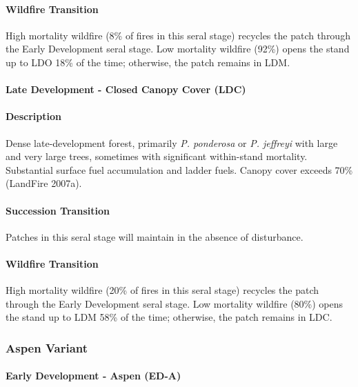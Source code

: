 \paragraph{Wildfire Transition} High mortality wildfire (8\% of fires in this seral stage) recycles the patch through the Early Development seral stage. Low mortality wildfire (92\%) opens the stand up to LDO 18\% of the time; otherwise, the patch remains in LDM.

\noindent\hrulefill

\paragraph{Late Development - Closed Canopy Cover (LDC)}

\paragraph{Description} Dense late-development forest, primarily \emph{P. ponderosa} or \emph{P. jeffreyi} with large and very large trees, sometimes with significant within-stand mortality. Substantial surface fuel accumulation and ladder fuels. Canopy cover exceeds 70\% (LandFire 2007a).

\paragraph{Succession Transition} Patches in this seral stage will maintain in the absence of disturbance.

\paragraph{Wildfire Transition} High mortality wildfire (20\% of fires in this seral stage) recycles the patch through the Early Development seral stage. Low mortality wildfire (80\%) opens the stand up to LDM 58\% of the time; otherwise, the patch remains in LDC.

\noindent\hrulefill
\noindent\hrulefill

\subsubsection{Aspen Variant}

\paragraph{Early Development - Aspen (ED-A)}

